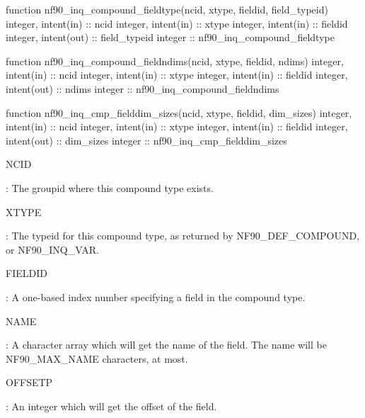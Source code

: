 \begin{DoxyCode}
\textcolor{keyword}{function }nf90\_inq\_compound\_fieldtype(ncid, xtype, fieldid, field\_typeid)
  \textcolor{keywordtype}{integer}, \textcolor{keywordtype}{intent(in)} :: ncid
  \textcolor{keywordtype}{integer}, \textcolor{keywordtype}{intent(in)} :: xtype
  \textcolor{keywordtype}{integer}, \textcolor{keywordtype}{intent(in)} :: fieldid
  \textcolor{keywordtype}{integer}, \textcolor{keywordtype}{intent(out)} :: field\_typeid
  \textcolor{keywordtype}{integer} :: nf90\_inq\_compound\_fieldtype

\textcolor{keyword}{function }nf90\_inq\_compound\_fieldndims(ncid, xtype, fieldid, ndims)
  \textcolor{keywordtype}{integer}, \textcolor{keywordtype}{intent(in)} :: ncid
  \textcolor{keywordtype}{integer}, \textcolor{keywordtype}{intent(in)} :: xtype
  \textcolor{keywordtype}{integer}, \textcolor{keywordtype}{intent(in)} :: fieldid
  \textcolor{keywordtype}{integer}, \textcolor{keywordtype}{intent(out)} :: ndims
  \textcolor{keywordtype}{integer} :: nf90\_inq\_compound\_fieldndims

\textcolor{keyword}{function }nf90\_inq\_cmp\_fielddim\_sizes(ncid, xtype, fieldid, dim\_sizes)
  \textcolor{keywordtype}{integer}, \textcolor{keywordtype}{intent(in)} :: ncid
  \textcolor{keywordtype}{integer}, \textcolor{keywordtype}{intent(in)} :: xtype
  \textcolor{keywordtype}{integer}, \textcolor{keywordtype}{intent(in)} :: fieldid
  \textcolor{keywordtype}{integer}, \textcolor{keywordtype}{intent(out)} :: dim\_sizes
  \textcolor{keywordtype}{integer} :: nf90\_inq\_cmp\_fielddim\_sizes
\end{DoxyCode}


{\ttfamily N\+C\+ID}

\+: The groupid where this compound type exists.

{\ttfamily X\+T\+Y\+PE}

\+: The typeid for this compound type, as returned by N\+F90\+\_\+\+D\+E\+F\+\_\+\+C\+O\+M\+P\+O\+U\+ND, or N\+F90\+\_\+\+I\+N\+Q\+\_\+\+V\+AR.

{\ttfamily F\+I\+E\+L\+D\+ID}

\+: A one-\/based index number specifying a field in the compound type.

{\ttfamily N\+A\+ME}

\+: A character array which will get the name of the field. The name will be N\+F90\+\_\+\+M\+A\+X\+\_\+\+N\+A\+ME characters, at most.

{\ttfamily O\+F\+F\+S\+E\+TP}

\+: An integer which will get the offset of the field.

